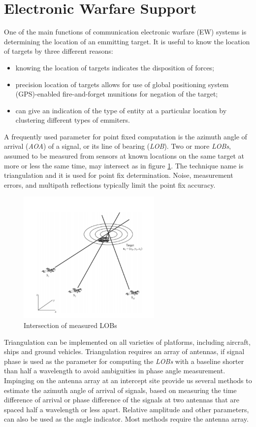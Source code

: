 \documentclass[english,purist]{ist-report}
\begin{document}
\pagebreak
\part{Electronic Warfare Support}

One of the main functions of communication electronic warfare (EW) systems is determining the location of an emmitting target. 
It is useful to know the location of targets by three different reasons:

\begin{itemize}
    \item knowing the location of targets indicates the disposition of forces;
    \item precision location of targets allows for use of global positioning system (GPS)-enabled fire-and-forget munitions for negation of the target;
    \item can give an indication of the type of entity at a particular location by clustering different types of emmiters. 
\end{itemize}

A frequently used parameter for point fixed computation is the azimuth angle of arrival (\textit{AOA}) of a signal, or its line of bearing (\textit{LOB}). Two or more \textit{LOBs}, assumed to be measured from sensors at known locations on the same target at more or less the same time, may intersect as in figure \ref{target1}. The technique name is triangulation and it is used for point fix determination. 
Noise, measurement errors, and multipath reflections typically limit the point fix accuracy. 

\begin{figure}[ht]
\centering
\includegraphics[width=70mm]{target1.png}
\caption{Intersection of measured LOBs}
\label{target1}
\end{figure} 

Triangulation can be implemented on all varieties of platforms, including aircraft, ships and ground vehicles. Triangulation requires an array of antennas, if signal phase is used as the parameter for computing the \textit{LOBs} with a baseline shorter than half a wavelength to avoid ambiguities in phase angle measurement.
Impinging on the antenna array at an intercept site provide us several methods to estimate the azimuth angle of arrival of signals, based on measuring the time difference of arrival or phase difference of the signals at two antennas that are spaced half a wavelength or less apart. Relative amplitude and other parameters, can also be used as the angle indicator. Most methods require the antenna array. 
\end{document}
